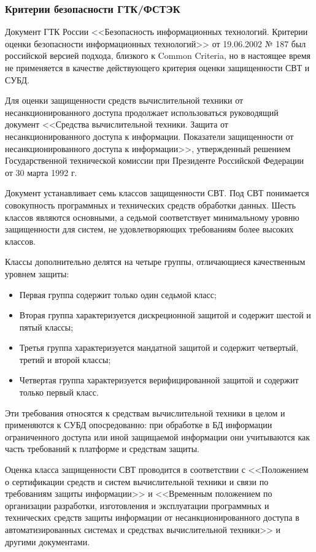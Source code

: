 \subsubsection{Критерии безопасности ГТК/ФСТЭК}

Документ ГТК России <<Безопасность информационных технологий. Критерии оценки безопасности информационных технологий>> от 19.06.2002 № 187 был российской версией подхода, близкого к Common Criteria, но в настоящее время не применяется в качестве действующего критерия оценки защищенности СВТ и СУБД. \cite{GTK187}

Для оценки защищенности средств вычислительной техники от несанкционированного доступа продолжает использоваться руководящий документ <<Средства вычислительной техники. Защита от несанкционированного доступа к информации. Показатели защищенности от несанкционированного доступа к информации>>, утвержденный решением Государственной технической комиссии при Президенте Российской Федерации от 30 марта 1992 г. \cite{GTK_1992}

Документ устанавливает семь классов защищенности СВТ. Под СВТ понимается совокупность программных и технических средств обработки данных. Шесть классов являются основными, а седьмой соответствует минимальному уровню защищенности для систем, не удовлетворяющих требованиям более высоких классов.

Классы дополнительно делятся на четыре группы, отличающиеся качественным уровнем защиты:
\begin{itemize}
	\item Первая группа содержит только один седьмой класс;
	\item Вторая группа характеризуется дискреционной защитой и содержит шестой и пятый классы;
	\item Третья группа характеризуется мандатной защитой и содержит четвертый, третий и второй классы;
	\item Четвертая группа характеризуется верифицированной защитой и содержит только первый класс.
\end{itemize}

Эти требования относятся к средствам вычислительной техники в целом и применяются к СУБД опосредованно: при обработке в БД информации ограниченного доступа или иной защищаемой информации они учитываются как часть требований к платформе и средствам защиты.

Оценка класса защищенности СВТ проводится в соответствии с
<<Положением о сертификации средств и систем вычислительной техники и связи по требованиям защиты информации>> и <<Временным положением по организации разработки, изготовления и эксплуатации программных и технических средств защиты информации от несанкционированного доступа в автоматизированных системах и средствах вычислительной техники>> и другими документами.

